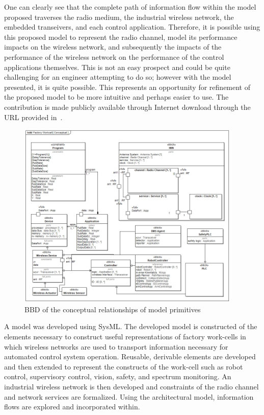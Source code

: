 One can clearly see that the complete path of information flow within the model proposed traverses the radio medium, the industrial wireless network, the embedded transeivers, and each control application. Therefore, it is possible using this proposed model to represent the radio channel, model its performance impacts on the wireless network, and subsequently the impacts of the performance of the wireless network on the performance of the control applications themselves.  This is not an easy prospect and could be quite challenging for an engineer attempting to do so; however with the model presented, it is quite possible.  This represents an opportunity for refinement of the proposed model to be more intuitive and perhaps easier to use.  The contribution is made publicly available through Internet download through the URL provided in~\cite{Candell2018SysML.DATA}.

\begin{figure}[!th]
	\centering
	\includegraphics[width=0.95\textwidth]{chapter-conclusions/images/Conceptual}
	\caption{BBD of the conceptual relationships of model primitives}
	\label{fig:concl:conceptual}
\end{figure}

A model was developed using SysML. The developed model is constructed of the elements necessary to construct useful representations of factory work-cells in which wireless networks are used to transport information necessary for automated control system operation.  Reusable, derivable elements are developed and then extended to represent the constructs of the work-cell such as robot control, supervisory control, vision, safety, and spectrum monitoring.  An industrial wireless network is then developed and constraints of the radio channel and network services are formalized. Using the architectural model, information flows are explored and incorporated within. 

